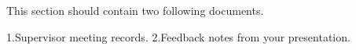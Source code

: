 This section should contain two following documents.

1.Supervisor meeting records.
2.Feedback notes from your presentation.